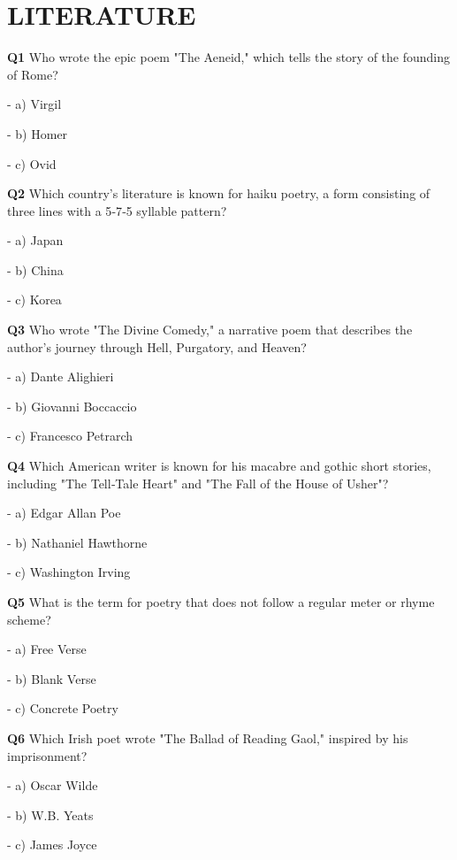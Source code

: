 \section{LITERATURE}

\textbf{Q1} Who wrote the epic poem "The Aeneid," which tells the story of the founding of Rome?\par
\quad - a) Virgil\par
\quad - b) Homer\par
\quad - c) Ovid\par

\textbf{Q2} Which country's literature is known for haiku poetry, a form consisting of three lines with a 5‑7‑5 syllable pattern?\par
\quad - a) Japan\par
\quad - b) China\par
\quad - c) Korea\par

\textbf{Q3} Who wrote "The Divine Comedy," a narrative poem that describes the author's journey through Hell, Purgatory, and Heaven?\par
\quad - a) Dante Alighieri\par
\quad - b) Giovanni Boccaccio\par
\quad - c) Francesco Petrarch\par

\textbf{Q4} Which American writer is known for his macabre and gothic short stories, including "The Tell‑Tale Heart" and "The Fall of the House of Usher"?\par
\quad - a) Edgar Allan Poe\par
\quad - b) Nathaniel Hawthorne\par
\quad - c) Washington Irving\par

\textbf{Q5} What is the term for poetry that does not follow a regular meter or rhyme scheme?\par
\quad - a) Free Verse\par
\quad - b) Blank Verse\par
\quad - c) Concrete Poetry\par

\textbf{Q6} Which Irish poet wrote "The Ballad of Reading Gaol," inspired by his imprisonment?\par
\quad - a) Oscar Wilde\par
\quad - b) W.B. Yeats\par
\quad - c) James Joyce\par

